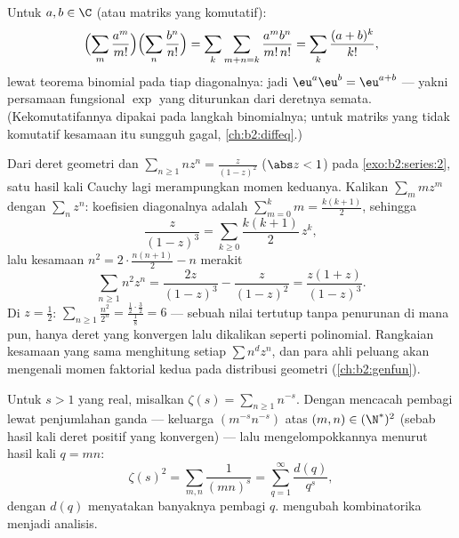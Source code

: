 \begin{example}\label{ex:b2:series:exp}
Untuk $a, b \in \C$ (atau matriks yang komutatif):
\[
\Bigl(\sum_m \frac{a^m}{m!}\Bigr)\Bigl(\sum_n
\frac{b^n}{n!}\Bigr)
= \sum_k \sum_{m+n=k} \frac{a^m b^n}{m!\,n!}
= \sum_k \frac{(a + b)^k}{k!},
\]
lewat teorema binomial pada tiap diagonalnya: jadi $\eu^a \eu^b =
\eu^{a+b}$ --- yakni persamaan fungsional $\exp$ yang diturunkan dari
deretnya semata. (Kekomutatifannya dipakai pada langkah binomialnya;
untuk matriks yang tidak komutatif kesamaan itu sungguh gagal,
\cref{ch:b2:diffeq}.)
\end{example}

\begin{example}\label{ex:b2:series:squaresum}
Dari deret geometri dan $\sum_{n \geq 1} nz^n = \frac{z}{(1-z)^2}$
($\abs z < 1$) pada \cref{exo:b2:series:2}, satu hasil kali
Cauchy lagi merampungkan momen keduanya. Kalikan $\sum_m
mz^m$ dengan $\sum_n z^n$: koefisien diagonalnya adalah $\sum_{m=0}^k
m = \frac{k(k+1)}2$, sehingga
\[
\frac{z}{(1-z)^3} = \sum_{k\geq0}\frac{k(k+1)}{2}\,z^k ,
\]
lalu kesamaan $n^2 = 2\cdot\frac{n(n+1)}2 - n$ merakit
\[
\sum_{n\geq1} n^2z^n = \frac{2z}{(1-z)^3} - \frac{z}{(1-z)^2}
= \frac{z(1+z)}{(1-z)^3} .
\]
Di $z = \frac12$: $\sum_{n\geq1}\frac{n^2}{2^n} =
\frac{\frac12\cdot\frac32}{\frac18} = 6$ --- sebuah nilai tertutup tanpa
penurunan di mana pun, hanya deret yang konvergen  lalu
dikalikan seperti polinomial. Rangkaian kesamaan yang sama
menghitung setiap $\sum n^dz^n$, dan para ahli peluang akan mengenali
momen faktorial kedua pada distribusi geometri
(\cref{ch:b2:genfun}).
\end{example}

\begin{example}\label{ex:b2:series:doublesum}
Untuk $s > 1$ yang real, misalkan $\zeta(s) = \sum_{n\geq1} n^{-s}$.
Dengan mencacah pembagi lewat penjumlahan ganda --- keluarga
$(m^{-s}n^{-s})$ atas $(m,n) \in (\N^*)^2$  (sebab hasil
kali deret positif yang konvergen) --- lalu mengelompokkannya menurut
hasil kali $q = mn$:
\[
\zeta(s)^2 = \sum_{m,n} \frac{1}{(mn)^s}
= \sum_{q=1}^{\infty} \frac{d(q)}{q^s},
\]
dengan $d(q)$ menyatakan banyaknya pembagi $q$. 
mengubah kombinatorika menjadi analisis.
\end{example}

